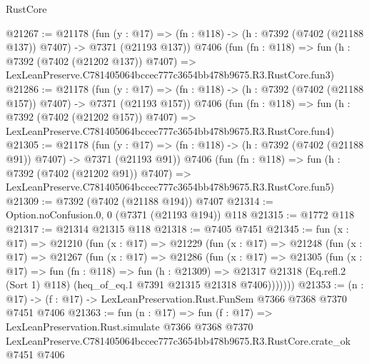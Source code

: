 \begin{lexlean}{RustCore}
\begin{coremodule}
@21267 := @21178
    (fun (y : @17) => (fn : @118) -> (h : @7392 (@7402 (@21188 @137)) @7407) -> @7371 (@21193 @137))
    @7406
    (fun (fn : @118) =>
    fun (h : @7392 (@7402 (@21202 @137)) @7407) =>
    LexLeanPreserve.C781405064bccec777c3654bb478b9675.R3.RustCore.fun3)
@21286 := @21178
    (fun (y : @17) => (fn : @118) -> (h : @7392 (@7402 (@21188 @157)) @7407) -> @7371 (@21193 @157))
    @7406
    (fun (fn : @118) =>
    fun (h : @7392 (@7402 (@21202 @157)) @7407) =>
    LexLeanPreserve.C781405064bccec777c3654bb478b9675.R3.RustCore.fun4)
@21305 := @21178
    (fun (y : @17) => (fn : @118) -> (h : @7392 (@7402 (@21188 @91)) @7407) -> @7371 (@21193 @91))
    @7406
    (fun (fn : @118) =>
    fun (h : @7392 (@7402 (@21202 @91)) @7407) =>
    LexLeanPreserve.C781405064bccec777c3654bb478b9675.R3.RustCore.fun5)
@21309 := @7392 (@7402 (@21188 @194)) @7407
@21314 := Option.noConfusion.{0, 0} (@7371 (@21193 @194)) @118
@21315 := @1772 @118
@21317 := @21314 @21315 @118
@21318 := @7405 @7451
@21345 := fun (x : @17) =>
  @21210
    (fun (x : @17) =>
    @21229
      (fun (x : @17) =>
      @21248
        (fun (x : @17) =>
        @21267
          (fun (x : @17) =>
          @21286
            (fun (x : @17) =>
            @21305
              (fun (x : @17) =>
              fun (fn : @118) =>
              fun (h : @21309) =>
              @21317
                @21318
                (Eq.refl.{2} (Sort 1) @118)
                (heq_of_eq.{1} @7391 @21315 @21318 @7406)))))))
@21353 := (n : @17) -> (f : @17) -> LexLeanPreservation.Rust.FunSem @7366 @7368 @7370 @7451 @7406
@21363 := fun (n : @17) =>
  fun (f : @17) =>
  LexLeanPreservation.Rust.simulate
    @7366
    @7368
    @7370
    LexLeanPreserve.C781405064bccec777c3654bb478b9675.R3.RustCore.crate_ok
    @7451
    @7406
\end{coremodule}
\end{lexlean}
